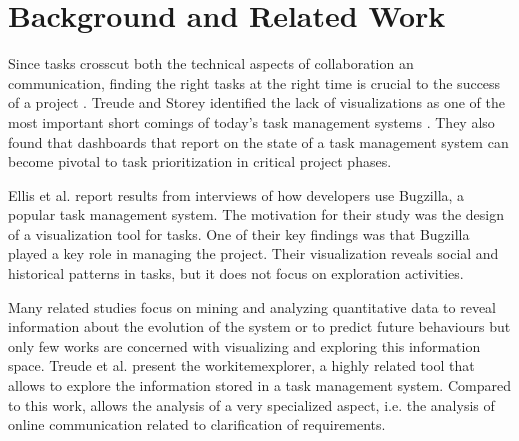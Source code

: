 \section{Background and Related Work}


Since  tasks crosscut both the technical aspects of collaboration an communication, finding the right tasks at the right time is crucial to the success of a project \cite{Kraut1995}.
Treude and Storey identified the lack of visualizations as one of the most important short comings of today's task management systems \cite{Treude2010}. They also found that dashboards that report on the state of a task management system can become pivotal to task prioritization in critical project phases.

Ellis  et al. \cite{Ellis2007} report results from interviews of how developers use Bugzilla, a popular task management system. 
The motivation for their study was the design of a visualization tool for tasks. 
One of their key findings was that Bugzilla played a key role in managing the project. 
Their visualization reveals social and historical patterns in tasks, but it does not focus on exploration activities.

Many related studies focus on mining and analyzing quantitative data to reveal information about the evolution of the system or to predict future behaviours but only few works are concerned with visualizing and exploring this information space. 
Treude et al. \cite{Treude2012} present the workitemexplorer, a highly related tool that allows to explore the information stored in a task management system.
Compared to this work, \viss allows the analysis of a very specialized aspect, i.e. the analysis of online communication related to clarification of requirements. 